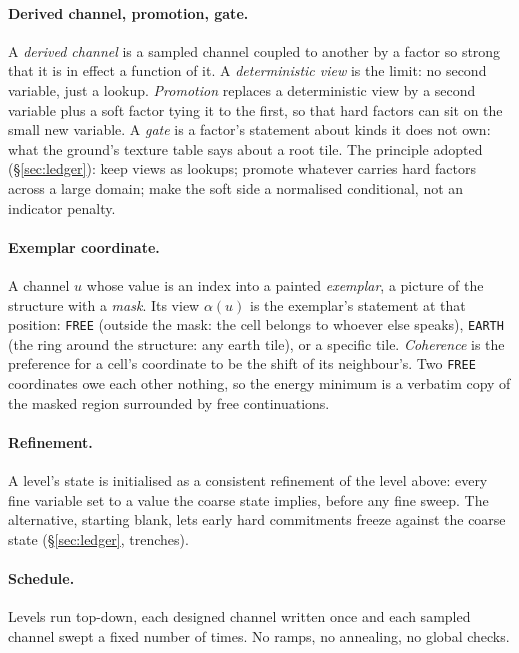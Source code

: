 \documentclass[11pt]{article}
\newcommand{\1}{\mathds{1}}
\newcommand{\code}[1]{\texttt{#1}}
\begin{document}
\paragraph{Derived channel, promotion, gate.} A \emph{derived channel} is
a sampled channel coupled to another by a factor so strong that it is in
effect a function of it. A \emph{deterministic view} is the limit: no
second variable, just a lookup. \emph{Promotion} replaces a deterministic
view by a second variable plus a soft factor tying it to the first, so
that hard factors can sit on the small new variable. A \emph{gate} is a
factor's statement about kinds it does not own: what the ground's texture
table says about a root tile. The principle adopted (\S\ref{sec:ledger}):
keep views as lookups; promote whatever carries hard factors across a
large domain; make the soft side a normalised conditional, not an
indicator penalty.

\paragraph{Exemplar coordinate.} A channel $u$ whose value is an index into
a painted \emph{exemplar}, a picture of the structure with a
\emph{mask}. Its view $\alpha(u)$ is the exemplar's statement at that
position: \code{FREE} (outside the mask: the cell belongs to whoever else
speaks), \code{EARTH} (the ring around the structure: any earth tile), or a
specific tile. \emph{Coherence} is the preference for a cell's coordinate
to be the shift of its neighbour's. Two \code{FREE} coordinates owe each
other nothing, so the energy minimum is a verbatim copy of the masked
region surrounded by free continuations.

\paragraph{Refinement.} A level's state is initialised as a consistent
refinement of the level above: every fine variable set to a value the
coarse state implies, before any fine sweep. The alternative, starting
blank, lets early hard commitments freeze against the coarse state
(\S\ref{sec:ledger}, trenches).

\paragraph{Schedule.} Levels run top-down, each designed channel written
once and each sampled channel swept a fixed number of times. No ramps, no
annealing, no global checks.
\end{document}
